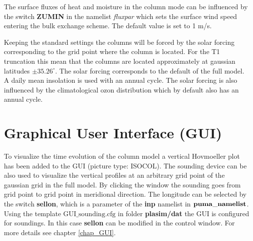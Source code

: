 The surface fluxes of heat and moisture in the 
column mode can be influenced by the switch {\bf ZUMIN} 
in the namelist {\it fluxpar} which sets the surface wind 
speed entering the bulk exchange scheme. The default value 
is set to 1 m/s.

Keeping the standard settings the columns will be forced by the solar
forcing corresponding to the grid point where the column is located.
For the T1 truncation this mean that the columns are located approximately
at gaussian latitudes $\pm 35.26^\circ$. The solar forcing corresponds
to the default of the full model. A daily mean insolation is
used with an annual cycle. The solar forcing is also influenced
by the climatological ozon distribution which by default also has
an annual cycle.


\section{Graphical User Interface (GUI)}

To visualize the time evolution of the column model a vertical Hovmoeller 
plot has been added to the GUI (picture type: ISOCOL).
The sounding device can be also used to visualize the vertical profiles at 
an arbitrary grid point of the gaussian grid in the full model. 
By clicking the window the sounding goes from grid point to grid point 
in meridional direction. The longitude can be selected by the switch 
{\bf sellon}, which is a parameter of the {\bf inp} namelist in 
$\mathrm{\bf puma\_namelist}$.  
Using the template $\mathrm{GUI\_sounding.cfg}$ in folder 
{\bf plasim/dat} the GUI is configured for soundings. 
In this case {\bf sellon} can be modified in the control window. 
For more details see chapter \ref{chap_GUI}. 

